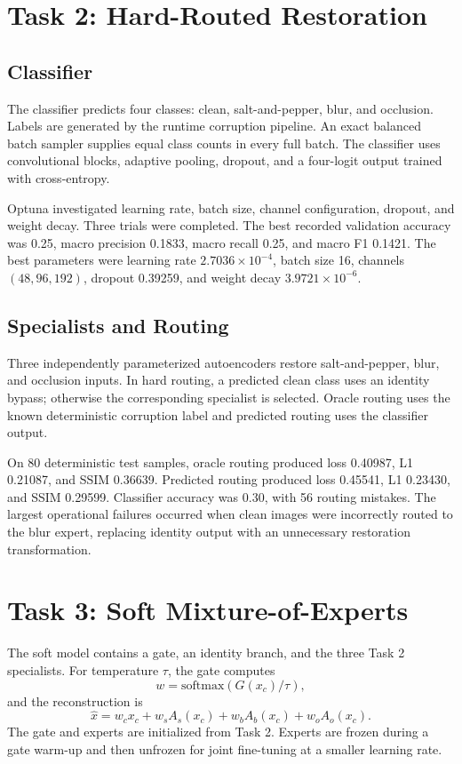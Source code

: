 \documentclass[conference]{IEEEtran}
\begin{document}
\section{Task 2: Hard-Routed Restoration}
\subsection{Classifier}
The classifier predicts four classes: clean, salt-and-pepper, blur, and occlusion. Labels are generated by the runtime corruption pipeline. An exact balanced batch sampler supplies equal class counts in every full batch. The classifier uses convolutional blocks, adaptive pooling, dropout, and a four-logit output trained with cross-entropy.

Optuna investigated learning rate, batch size, channel configuration, dropout, and weight decay. Three trials were completed. The best recorded validation accuracy was 0.25, macro precision 0.1833, macro recall 0.25, and macro F1 0.1421. The best parameters were learning rate $2.7036\times10^{-4}$, batch size 16, channels $(48,96,192)$, dropout 0.39259, and weight decay $3.9721\times10^{-6}$.

\subsection{Specialists and Routing}
Three independently parameterized autoencoders restore salt-and-pepper, blur, and occlusion inputs. In hard routing, a predicted clean class uses an identity bypass; otherwise the corresponding specialist is selected. Oracle routing uses the known deterministic corruption label and predicted routing uses the classifier output.

On 80 deterministic test samples, oracle routing produced loss 0.40987, L1 0.21087, and SSIM 0.36639. Predicted routing produced loss 0.45541, L1 0.23430, and SSIM 0.29599. Classifier accuracy was 0.30, with 56 routing mistakes. The largest operational failures occurred when clean images were incorrectly routed to the blur expert, replacing identity output with an unnecessary restoration transformation.

\section{Task 3: Soft Mixture-of-Experts}
The soft model contains a gate, an identity branch, and the three Task 2 specialists. For temperature $\tau$, the gate computes
\begin{equation}
w=\mathrm{softmax}(G(x_c)/\tau),
\end{equation}
and the reconstruction is
\begin{equation}
\hat{x}=w_cx_c+w_sA_s(x_c)+w_bA_b(x_c)+w_oA_o(x_c).
\end{equation}
The gate and experts are initialized from Task 2. Experts are frozen during a gate warm-up and then unfrozen for joint fine-tuning at a smaller learning rate.
\end{document}
